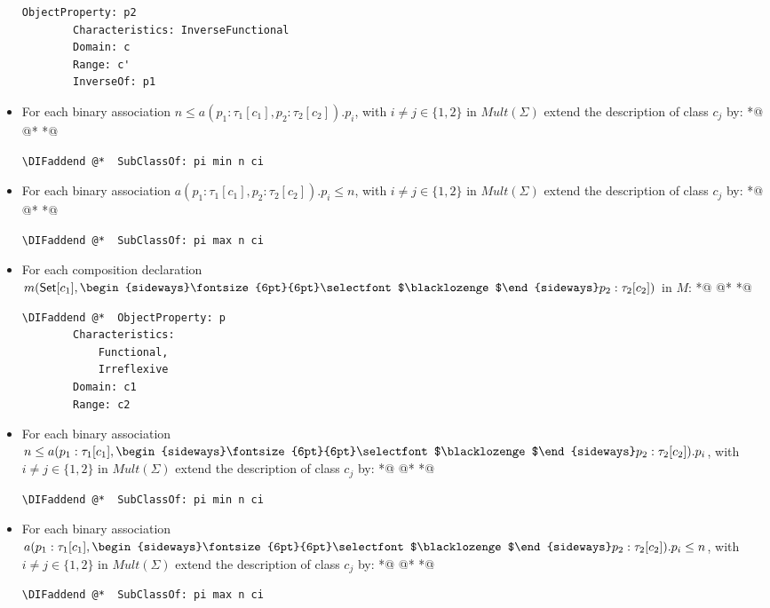 \documentclass[10pt,fleqn,final]{scrreprt}
\newenvironment{definitions}[0]{\medskip }{}
\newcommand{\composition}{\raisebox{0.2pt}{\begin{sideways}\fontsize{6pt}{6pt}\selectfont$\blacklozenge$\end{sideways}}}
\providecommand{\DIFaddbegin}{} %
\providecommand{\DIFaddend}{} %
\providecommand{\DIFdelbegin}{} %
\providecommand{\DIFdelend}{} %
\begin{document}
\begin{definitions}
\begin{itemize}
\begin{lstlisting}[language=owl2Manchester]
	ObjectProperty: p2
		Characteristics: InverseFunctional
		Domain: c
		Range: c'
		InverseOf: p1
\end{lstlisting}
\item For each binary association $n \leq a(p_1:\tau_1[c_1],p_2:\tau_2[c_2]).p_i$, with $i \neq j\in\{1,2\}$ in $\mathit{Mult}(\Sigma)$ extend the description of class $c_j$ by:
 *@ \DIFdelbegin %
\DIFdelend @*   *@ \DIFaddbegin \begin{lstlisting}[language=owl2Manchester]
	\DIFaddend @*  SubClassOf: pi min n ci
\end{lstlisting}
\item For each binary association $a(p_1:\tau_1[c_1],p_2:\tau_2[c_2]).p_i \leq n$, with $i \neq j\in\{1,2\}$  in $\mathit{Mult}(\Sigma)$ extend the description of class $c_j$ by:
 *@ \DIFdelbegin %
\DIFdelend @*   *@ \DIFaddbegin \begin{lstlisting}[language=owl2Manchester]
	\DIFaddend @*  SubClassOf: pi max n ci
\end{lstlisting}
\item For each composition declaration $m(\mathsf{Set}[c_1], \composition p_2 :
\tau_2[c_2])$ in $M$:
 *@ \DIFdelbegin %
\DIFdelend @*   *@ \DIFaddbegin \begin{lstlisting}[language=owl2Manchester]
	\DIFaddend @*  ObjectProperty: p
		Characteristics:
			Functional, 
			Irreflexive
		Domain: c1
		Range: c2
\end{lstlisting}
\item For each binary association $n \leq a(p_1:\tau_1[c_1], \composition p_2:\tau_2[c_2]).p_i$, with $i \neq j\in\{1,2\}$  in $\mathit{Mult}(\Sigma)$  extend the description of class $c_j$ by:
 *@ \DIFdelbegin %
\DIFdelend @*   *@ \DIFaddbegin \begin{lstlisting}[language=owl2Manchester]
	\DIFaddend @*  SubClassOf: pi min n ci
\end{lstlisting}
\item For each binary association $a(p_1:\tau_1[c_1], \composition p_2:\tau_2[c_2]).p_i \leq n$, with $i \neq j\in\{1,2\}$  in $\mathit{Mult}(\Sigma)$ extend the description of class $c_j$ by:
 *@ \DIFdelbegin %
\DIFdelend @*   *@ \DIFaddbegin \begin{lstlisting}[language=owl2Manchester]
	\DIFaddend @*  SubClassOf: pi max n ci
\end{lstlisting}
\end{itemize}



\end{definitions}
\end{document}
